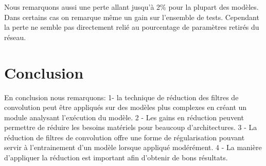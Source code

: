 \documentclass[12pt]{article}
\begin{document}
Nous remarquons aussi une perte allant jusqu’à 2\% pour la plupart des modèles. Dans certains cas on remarque même un gain sur l’ensemble de tests. Cependant la perte ne semble pas directement relié au pourcentage de paramètres retirés du réseau. 

\section*{Conclusion}
En conclusion nous remarquons: 1- la technique de réduction des filtres de convolution peut être appliqués sur des modèles plus complexes en créant un module analysant l’exécution du modèle. 2 - Les gains en réduction peuvent permettre de réduire les besoins matériels pour beaucoup d’architectures. 3 - La réduction de filtres de convolution offre une forme de régularisation pouvant servir à l’entrainement d'un modèle lorsque appliqué modérément. 4 - La manière d’appliquer la réduction est important afin d'obtenir de bons résultats. 

\newpage



\end{document}

